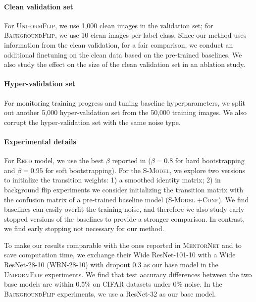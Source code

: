 \paragraph{Clean validation set} For \textsc{UniformFlip}, we use 1,000 clean images in the
validation set; for \textsc{BackgroundFlip}, we use 10 clean images per label class. Since our
method uses information from the clean validation, for a fair comparison, we conduct an additional
finetuning on the clean data based on the pre-trained baselines. We also study the effect on the
size of the clean validation set in an ablation study.
\vspace{-0.05in}
\paragraph{Hyper-validation set} For monitoring training progress and tuning baseline
hyperparameters, we split out another 5,000 hyper-validation set from the 50,000 training images. We
also corrupt the hyper-validation set with the same noise type.


\vspace{-0.05in}
\paragraph{Experimental details} For \textsc{Reed} model, we use the best $\beta$ reported in
\citet{reed14noisy} ($\beta=0.8$ for hard bootstrapping and $\beta=0.95$ for soft bootstrapping).
For the \textsc{S-Model}, we explore two versions to initialize the transition weights: 1) a
smoothed identity matrix; 2) in background flip experiments we consider initializing the transition
matrix with the confusion matrix of a pre-trained baseline model (\textsc{S-Model +Conf}). We find
baselines can easily overfit the training noise, and therefore we also study early stopped versions
of the baselines to provide a stronger comparison. In contrast, we find early stopping not necessary
for our method.

To make our results comparable with the ones reported in \textsc{MentorNet} and to save computation
time, we exchange their Wide ResNet-101-10 with a Wide ResNet-28-10 (WRN-28-10) \cite{wrn} with
dropout 0.3 as our base model in the \textsc{UniformFlip} experiments. We find that test accuracy
differences between the two base models are within 0.5\% on CIFAR datasets under 0\% noise. In the
\textsc{BackgroundFlip} experiments, we use a ResNet-32 \cite{resnet} as our base model.

